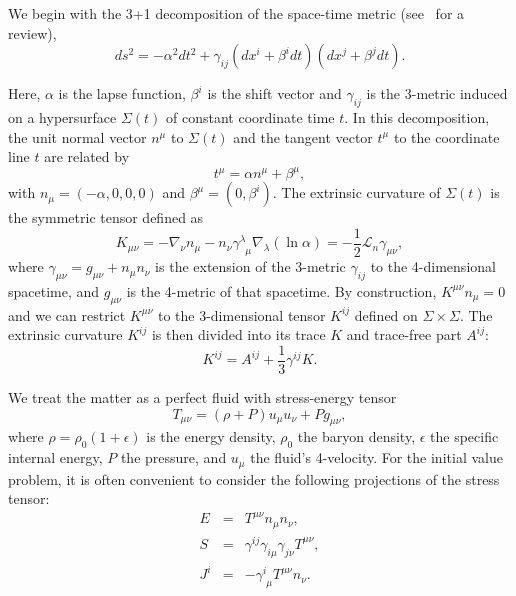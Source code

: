 {We begin with the 3+1 decomposition of the space-time metric
(see~\cite{2007gr.qc.....3035G} for a review),
\begin{equation}
ds^2 = -\alpha^2 dt^2 + \gamma_{ij}\left(dx^i +
\beta^idt\right)\left(dx^j + \beta^jdt\right).
\end{equation}

Here, $\alpha$ is the lapse function, $\beta^i$ is the shift vector
and $\gamma_{ij}$ is the 3-metric induced on a hypersurface
$\Sigma(t)$ of constant coordinate time $t$. In this decomposition, the unit normal
vector $n^{\mu}$ to $\Sigma(t)$ and the tangent vector $t^{\mu}$ to
the coordinate line $t$ are related by
\begin{equation}
t^{\mu} = \alpha n^{\mu} + \beta^{\mu},
\end{equation}
with $n_\mu=(-\alpha,0,0,0)$ and $\beta^\mu=(0,\beta^i)$.  The
extrinsic curvature of $\Sigma(t)$ is the symmetric tensor defined as
\begin{equation}
K_{\mu\nu} = -\nabla_\nu n_\mu -n_\nu \gamma^\lambda_{\phantom{\lambda}\mu} \nabla_\lambda (\ln \alpha) =
-\frac{1}{2}\mathcal{L}_n \gamma_{\mu\nu},
\end{equation}
where $\gamma_{\mu \nu}=g_{\mu \nu} + n_\mu n_\nu$ is the extension of
the 3-metric $\gamma_{ij}$ to the 4-dimensional spacetime, and $g_{\mu
  \nu}$ is the 4-metric of that spacetime. By construction, $K^{\mu
  \nu}n_\mu =0$ and we can restrict $K^{\mu \nu}$ to the 3-dimensional
tensor $K^{ij}$ defined on $\Sigma \times \Sigma$. The extrinsic
curvature $K^{ij}$ is then divided into its trace $K$ and trace-free
part $A^{ij}$:
\begin{equation}
K^{ij} = A^{ij} + \frac{1}{3}\gamma^{ij}K.
\end{equation}

We treat the matter as a perfect fluid with stress-energy tensor
\begin{equation}
T_{\mu\nu} = \left(\rho+P\right)u_{\mu}u_{\nu} + Pg_{\mu\nu},
\end{equation}
where $\rho=\rho_0 (1+\epsilon)$ is the energy density, $\rho_0$ the
baryon density, $\epsilon$ the specific internal energy, $P$ the
pressure, and $u_\mu$ the fluid's 4-velocity. For the initial value
problem, it is often convenient to consider the following projections
of the stress tensor:
\begin{eqnarray}
E &=& T^{\mu\nu}n_{\mu}n_{\nu}, \\ S &=&
\gamma^{ij}\gamma_{i\mu}\gamma_{j\nu}T^{\mu\nu},\\ J^{i} &=&
-\gamma^{i}_{\phantom{i}\mu}T^{\mu\nu}n_{\nu}.
\end{eqnarray}

}
